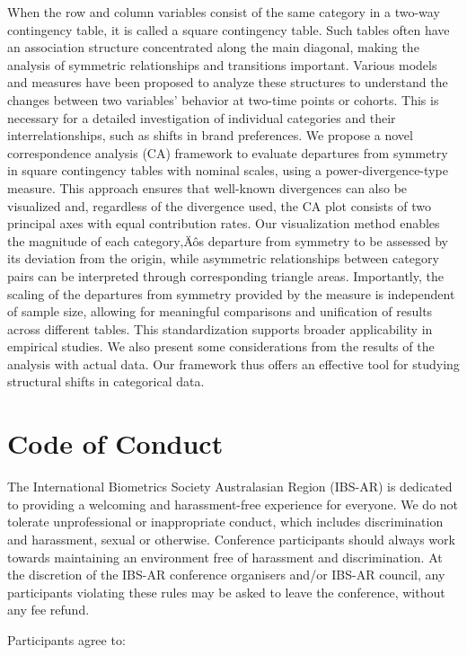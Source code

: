 \documentclass[
]{scrreprt}
\begin{document}
When the row and column variables consist of the same category in a
two-way contingency table, it is called a square contingency table. Such
tables often have an association structure concentrated along the main
diagonal, making the analysis of symmetric relationships and transitions
important. Various models and measures have been proposed to analyze
these structures to understand the changes between two variables'
behavior at two-time points or cohorts. This is necessary for a detailed
investigation of individual categories and their interrelationships,
such as shifts in brand preferences. We propose a novel correspondence
analysis (CA) framework to evaluate departures from symmetry in square
contingency tables with nominal scales, using a power-divergence-type
measure. This approach ensures that well-known divergences can also be
visualized and, regardless of the divergence used, the CA plot consists
of two principal axes with equal contribution rates. Our visualization
method enables the magnitude of each category‚Äôs departure from
symmetry to be assessed by its deviation from the origin, while
asymmetric relationships between category pairs can be interpreted
through corresponding triangle areas. Importantly, the scaling of the
departures from symmetry provided by the measure is independent of
sample size, allowing for meaningful comparisons and unification of
results across different tables. This standardization supports broader
applicability in empirical studies. We also present some considerations
from the results of the analysis with actual data. Our framework thus
offers an effective tool for studying structural shifts in categorical
data.

\chapter{Code of Conduct}\label{code-of-conduct}

The International Biometrics Society Australasian Region (IBS-AR) is
dedicated to providing a welcoming and harassment-free experience for
everyone. We do not tolerate unprofessional or inappropriate conduct,
which includes discrimination and harassment, sexual or otherwise.
Conference participants should always work towards maintaining an
environment free of harassment and discrimination. At the discretion of
the IBS-AR conference organisers and/or IBS-AR council, any participants
violating these rules may be asked to leave the conference, without any
fee refund.

Participants agree to:
\end{document}
